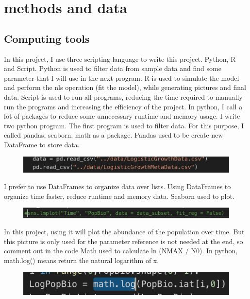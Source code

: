 \documentclass[11pt,a4 paper,title page]{article}
\begin{document}
  \section{methods and data}

    \subsection{Computing tools}
In this project, I use three scripting language to write this project. Python, R and Script. Python is used to filter data from sample data and find some parameter that I will use in the next program. R is used to simulate the model and perform the nls operation (fit the model), while generating pictures and final data. Script is used to run all programs, reducing the time required to manually run the programs and increasing the efficiency of the project. In python, I call a lot of packages to reduce some unnecessary runtime and memory usage. I write two python program. The first program is used to filter data. For this purpose, I called pandas, seaborn, math as a package. Pandas used to be create new DataFrame to store data.
\begin{figure}[H]
\centering
\includegraphics[width=.8\textwidth]{../picture/figure7.png}
\end{figure}
\hfill\break
I prefer to use DataFrames to organize data over lists. Using DataFrames to organize time faster, reduce runtime and memory data.
\hfill\break
\hfill\break
Seaborn used to plot.
\begin{figure}[H]
\centering
\includegraphics[width=.8\textwidth]{../picture/figure8.png}
\end{figure}
\hfill\break
In this project, using it will plot the abundance of the population over time. But this picture is only used for the parameter reference is not needed at the end, so comment out in the code
\hfill\break
\hfill\break
Math used to calculate ln (NMAX / N0). In python, math.log() means return the natural logarithm of x.
\begin{figure}[H]
\centering
\includegraphics[width=.8\textwidth]{../picture/figure9.png}
\end{figure}
\end{document}
